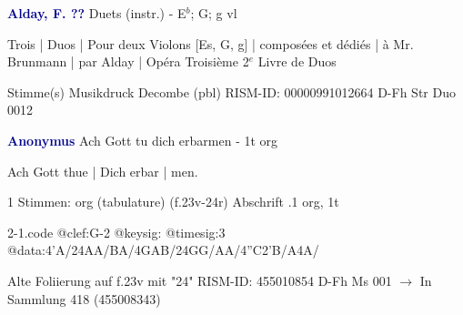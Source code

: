 \documentclass[twocolumn]{book}
\begin{document}
\newline \par \vspace{7pt} \textcolor{darkblue}{\textbf{Alday, F.  ??}}
\newline Duets (instr.) - E$^b$; G; g
 vl
\newline \begin{itshape}Trois | Duos | Pour deux Violons [Es, G, g] | composées et dédiés | à Mr. Brunmann | par Alday | Opéra Troisième 2$^e$ Livre de Duos\end{itshape} 
\newline \textcolor{darkblue}{}  Stimme(s)
\newline Musikdruck
\newline Decombe  (pbl)
\newline RISM-ID: 00000991012664
\newline D-Fh  Str Duo 0012
\newline \par \vspace{7pt} \textcolor{darkblue}{\textbf{Anonymus  }}
\newline Ach Gott tu dich erbarmen - 1t
\newline org
\newline \begin{itshape}[f.23v, at left:] Ach Gott thue | Dich erbar | men.\end{itshape} 
\newline \textcolor{darkblue}{}  1 Stimmen: org (tabulature)  (f.23v-24r)
\newline Abschrift
.1  org, 1t  
\begin{filecontents*}{2-1.code}
@clef:G-2
@keysig:
@timesig:3
@data:4'A/24AA/BA/4GAB/24GG/AA/4''C2'B/A4A/
\end{filecontents*}
\newline
%
\newline Alte Foliierung auf f.23v mit "24"
\newline RISM-ID: 455010854
\newline D-Fh  Ms 001
\newline $\rightarrow$ In Sammlung 418 (455008343)
      
\end{document}
